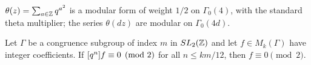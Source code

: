 \begin{fact}\label{fact:theta}
$\theta(z)=\sum_{a\in\mathbb{Z}}q^{a^2}$ is a modular form of weight $1/2$ on
$\Gamma_0(4)$, with the standard theta multiplier; the series $\theta(dz)$ are
modular on $\Gamma_0(4d)$.
\end{fact}

\begin{fact}\label{fact:sturm}
Let $\Gamma$ be a congruence subgroup of index $m$ in $SL_2(\mathbb{Z})$ and let
$f\in M_k(\Gamma)$ have integer coefficients. If $[q^{n}]f\equiv0\pmod2$ for all
$n\le km/12$, then $f\equiv0\pmod2$.
\end{fact}

